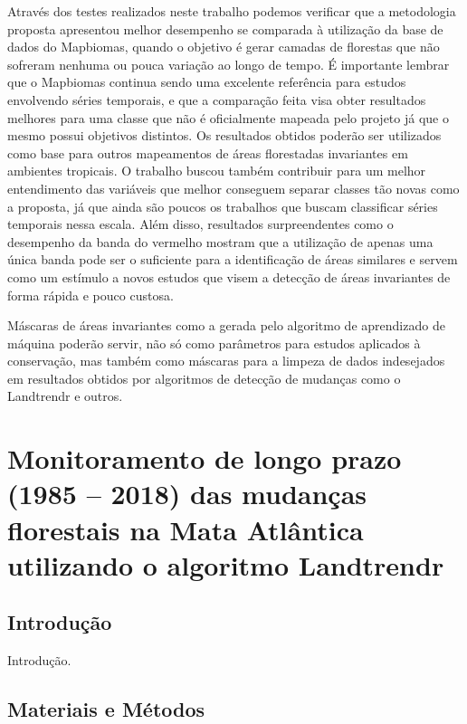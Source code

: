 \documentclass[12pt,a4paper]{article}
\begin{document}
Através dos testes realizados neste trabalho podemos verificar que a metodologia proposta apresentou melhor desempenho se comparada à utilização da base de dados do Mapbiomas, quando o objetivo é gerar camadas de florestas que não sofreram nenhuma ou pouca variação ao longo de tempo. É importante lembrar que o Mapbiomas continua sendo uma excelente referência para estudos envolvendo séries temporais, e que a comparação feita visa obter resultados melhores para uma classe que não é oficialmente mapeada pelo projeto já que o mesmo possui objetivos distintos. Os resultados obtidos poderão ser utilizados como base para outros mapeamentos de áreas florestadas invariantes em ambientes tropicais. O trabalho buscou também contribuir para um melhor entendimento das variáveis que melhor conseguem separar classes tão novas como a proposta, já que ainda são poucos os trabalhos que buscam classificar séries temporais nessa escala. Além disso, resultados surpreendentes como o desempenho da banda do vermelho mostram que a utilização de apenas uma única banda pode ser o suficiente para a identificação de áreas similares e servem como um estímulo a novos estudos que visem a detecção de áreas invariantes de forma rápida e pouco custosa.

Máscaras de áreas invariantes como a gerada pelo algoritmo de aprendizado de máquina poderão servir, não só como parâmetros para estudos aplicados à conservação, mas também como máscaras para a limpeza de dados indesejados em resultados obtidos por algoritmos de detecção de mudanças como o Landtrendr e outros.

\newpage
\section{Monitoramento de longo prazo (1985 – 2018) das mudanças florestais na Mata Atlântica utilizando o algoritmo Landtrendr}
\subsection{Introdução}
Introdução.

\subsection{Materiais e Métodos}
\end{document}
